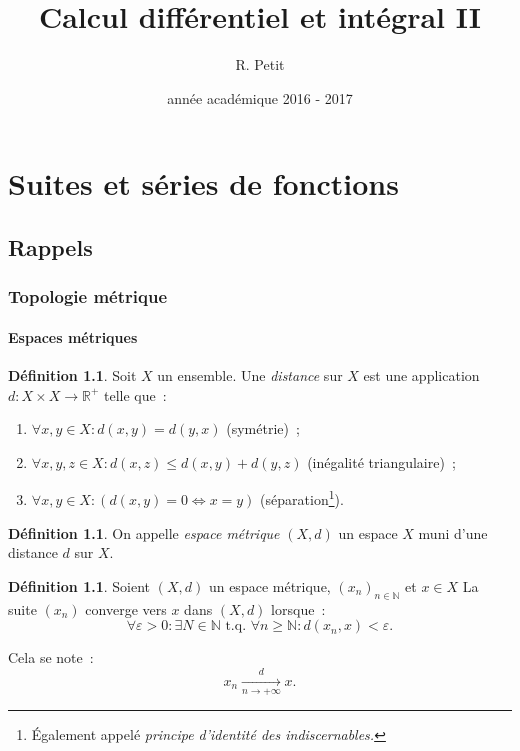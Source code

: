 \documentclass{report}
\title{Calcul différentiel et intégral II}
\author{R. Petit}
\date{année académique 2016 - 2017}
\theoremstyle{definition}
\newtheorem{déf}[thm]{Définition}
\theoremstyle{remark}
\newcommand{\R}{\mathbb R}
\newcommand{\Rp}{\R^{+}}
\newcommand{\N}{\mathbb N}
\newcommand{\tq}{\text{ t.q. }}
\newcommand{\seq}[3]{\left(#1_{#2}\right)_{#2 \in #3}}
\newcommand{\mconv}[3]{\xrightarrow[#1 \to #2]{#3}}
\newcommand{\pinfty}{{+\infty}}
\begin{document}
\maketitle
\tableofcontents
\newpage
\setcounter{page}{1}

\chapter{Suites et séries de fonctions}
	\section{Rappels}
		\subsection{Topologie métrique}
			\subsubsection{Espaces métriques}
				\begin{déf} Soit $X$ un ensemble. Une \textit{distance} sur $X$ est une application $d : X \times X \to \Rp$ telle que~:

				\begin{enumerate}
					\item $\forall x, y \in X : d(x, y) = d(y, x)$ (symétrie)~;
					\item $\forall x, y, z \in X : d(x, z) \leq d(x, y) + d(y, z)$ (inégalité triangulaire)~;
					\item $\forall x, y \in X : \left(d(x, y) = 0 \iff x = y\right)$ (séparation\footnote{Également appelé
					      \textit{principe d'identité des indiscernables.}}).
				\end{enumerate}
				\end{déf}

				\begin{déf}  On appelle \textit{espace métrique} $(X, d)$ un espace $X$ muni d'une distance $d$ sur $X$. \end{déf}

				\begin{déf} Soient $(X, d)$ un espace métrique, $\seq xn\N$ et $x \in X$ La suite $(x_n)$ converge vers $x$ dans $(X, d)$ lorsque~:
				\[\forall \varepsilon > 0 : \exists N \in \N \tq \forall n \geq \N : d(x_n, x) < \varepsilon.\]

				Cela se note~:
				\[x_n \mconv n\pinfty d x.\]
				\end{déf}
\end{document}
